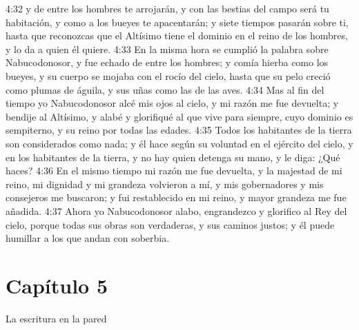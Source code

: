 4:32 y de entre los hombres te arrojarán, y con las bestias del campo será tu habitación, y como a los bueyes te apacentarán; y siete tiempos pasarán sobre ti, hasta que reconozcas que el Altísimo tiene el dominio en el reino de los hombres, y lo da a quien él quiere. 
4:33 En la misma hora se cumplió la palabra sobre Nabucodonosor, y fue echado de entre los hombres; y comía hierba como los bueyes, y su cuerpo se mojaba con el rocío del cielo, hasta que su pelo creció como plumas de águila, y sus uñas como las de las aves. 
4:34 Mas al fin del tiempo yo Nabucodonosor alcé mis ojos al cielo, y mi razón me fue devuelta; y bendije al Altísimo, y alabé y glorifiqué al que vive para siempre, cuyo dominio es sempiterno, y su reino por todas las edades. 
4:35 Todos los habitantes de la tierra son considerados como nada; y él hace según su voluntad en el ejército del cielo, y en los habitantes de la tierra, y no hay quien detenga su mano, y le diga: ¿Qué haces? 
4:36 En el mismo tiempo mi razón me fue devuelta, y la majestad de mi reino, mi dignidad y mi grandeza volvieron a mí, y mis gobernadores y mis consejeros me buscaron; y fui restablecido en mi reino, y mayor grandeza me fue añadida. 
4:37 Ahora yo Nabucodonosor alabo, engrandezco y glorifico al Rey del cielo, porque todas sus obras son verdaderas, y sus caminos justos; y él puede humillar a los que andan con soberbia. 
\section*{Capítulo 5 }
La escritura en la pared 
 
